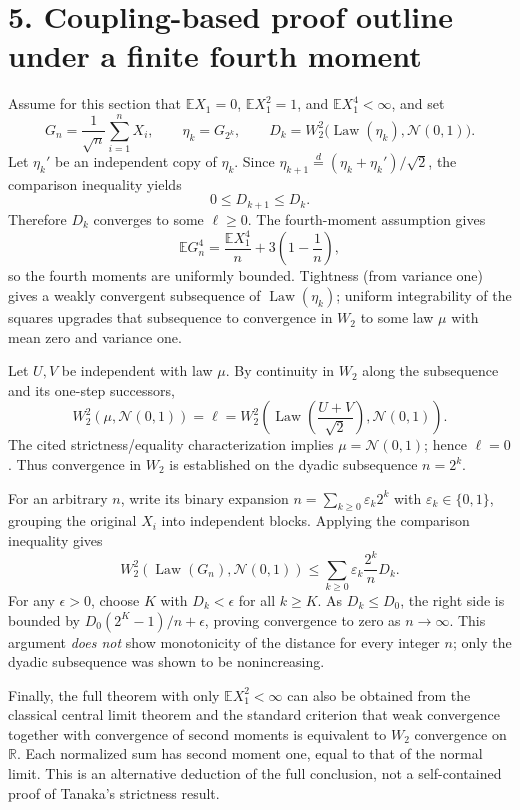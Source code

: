 \documentclass[10pt,a4paper]{article}
\newcommand{\R}{\mathbb R}\newcommand{\E}{\mathbb E}\newcommand{\Var}{\operatorname{Var}}
\newcommand{\Law}{\operatorname{Law}}\newcommand{\N}{\mathcal N}
\newcommand{\W}{W_2}
\begin{document}
\section*{5. Coupling-based proof outline under a finite fourth moment}
Assume for this section that $\E X_1=0$, $\E X_1^2=1$, and $\E X_1^4<\infty$, and set
\[
G_n=\frac{1}{\sqrt n}\sum_{i=1}^nX_i,\qquad
\eta_k=G_{2^k},\qquad
D_k=\W^2\bigl(\Law(\eta_k),\N(0,1)\bigr).
\]
Let $\eta_k'$ be an independent copy of $\eta_k$. Since
$\eta_{k+1}\stackrel d=(\eta_k+\eta_k')/\sqrt2$, the comparison inequality yields
\[
0\le D_{k+1}\le D_k.
\]
Therefore $D_k$ converges to some $\ell\ge0$. The fourth-moment assumption gives
\[
\E G_n^4=\frac{\E X_1^4}{n}+3\left(1-\frac1n\right),
\]
so the fourth moments are uniformly bounded. Tightness (from variance one) gives a weakly convergent subsequence of $\Law(\eta_k)$; uniform integrability of the squares upgrades that subsequence to convergence in $W_2$ to some law $\mu$ with mean zero and variance one.

Let $U,V$ be independent with law $\mu$. By continuity in $W_2$ along the subsequence and its one-step successors,
\[
\W^2(\mu,\N(0,1))=\ell
=\W^2\left(\Law\left(\frac{U+V}{\sqrt2}\right),\N(0,1)\right).
\]
The cited strictness/equality characterization implies $\mu=\N(0,1)$; hence $\ell=0$. Thus convergence in $W_2$ is established on the dyadic subsequence $n=2^k$.

For an arbitrary $n$, write its binary expansion $n=\sum_{k\ge0}\varepsilon_k2^k$ with $\varepsilon_k\in\{0,1\}$, grouping the original $X_i$ into independent blocks. Applying the comparison inequality gives
\[
\W^2(\Law(G_n),\N(0,1))
\le\sum_{k\ge0}\varepsilon_k\frac{2^k}{n}D_k.
\]
For any $\epsilon>0$, choose $K$ with $D_k<\epsilon$ for all $k\ge K$. As $D_k\le D_0$, the right side is bounded by $D_0(2^K-1)/n+\epsilon$, proving convergence to zero as $n\to\infty$. This argument \emph{does not} show monotonicity of the distance for every integer $n$; only the dyadic subsequence was shown to be nonincreasing.

Finally, the full theorem with only $\E X_1^2<\infty$ can also be obtained from the classical central limit theorem and the standard criterion that weak convergence together with convergence of second moments is equivalent to $W_2$ convergence on $\R$. Each normalized sum has second moment one, equal to that of the normal limit. This is an alternative deduction of the full conclusion, not a self-contained proof of Tanaka's strictness result.
\end{document}
